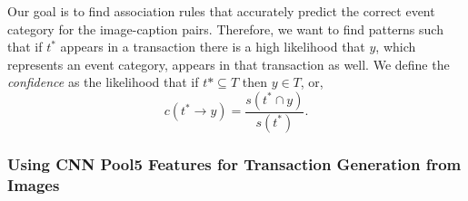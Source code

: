 \documentclass[10pt,twocolumn,letterpaper]{article}
\begin{document}
{Our goal is to find association rules that accurately predict the correct event category for the image-caption pairs.
Therefore, we want to find patterns such that if $t^*$ appears in a transaction there is a high likelihood that $y$, which represents an event category, appears in that transaction as well.
We define the {\it confidence} as the likelihood that if $t* \subseteq T$ then $y \in T$, or,
\begin{equation}
\label{confidence}
c(t^* \rightarrow y) = \frac{s(t^* \cap y)}{s(t^*)}.
\end{equation}

\subsubsection{Using CNN Pool5 Features for Transaction Generation from Images}
\label{pool5}
}
\end{document}
